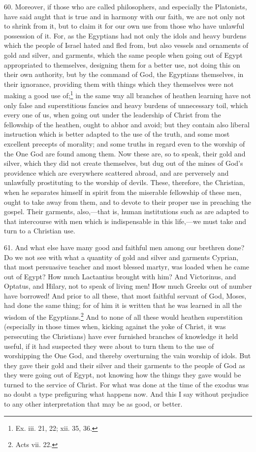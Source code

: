 60. Moreover, if those who are called philosophers, and especially the Platonists, have said aught that is true and in harmony with our faith, we are not only not to shrink from it, but to claim it for our own use from those who have unlawful possession of it. For, as the Egyptians had not only the idols and heavy burdens which the people of Israel hated and fled from, but also vessels and ornaments of gold and silver, and garments, which the same people when going out of Egypt appropriated to themselves, designing them for a better use, not doing this on their own authority, but by the command of God, the Egyptians themselves, in their ignorance, providing them with things which they themselves were not making a good use of;\footnote{Ex. iii. 21, 22; xii. 35, 36.} in the same way all branches of heathen learning have not only false and superstitious fancies and heavy burdens of unnecessary toil, which every one of us, when going out under the leadership of Christ from the fellowship of the heathen, ought to abhor and avoid; but they contain also liberal instruction which is better adapted to the use of the truth, and some most excellent precepts of morality; and some truths in regard even to the worship of the One God are found among them. Now these are, so to speak, their gold and silver, which they did not create themselves, but dug out of the mines of God’s providence which are everywhere scattered abroad, and are perversely and unlawfully prostituting to the worship of devils. These, therefore, the Christian, when he separates himself in spirit from the miserable fellowship of these men, ought to take away from them, and to devote to their proper use in preaching the gospel. Their garments, also,—that is, human institutions such as are adapted to that intercourse with men which is indispensable in this life,—we must take and turn to a Christian use.

61. And what else have many good and faithful men among our brethren done? Do we not see with what a quantity of gold and silver and garments Cyprian, that most persuasive teacher and most blessed martyr, was loaded when he came out of Egypt? How much Lactantius brought with him? And Victorinus, and Optatus, and Hilary, not to speak of living men! How much Greeks out of number have borrowed! And prior to all these, that most faithful servant of God, Moses, had done the same thing; for of him it is written that he was learned in all the wisdom of the Egyptians.\footnote{Acts vii. 22.} And to none of all these would heathen superstition (especially in those times when, kicking against the yoke of Christ, it was persecuting the Christians) have ever furnished branches of knowledge it held useful, if it had suspected they were about to turn them to the use of worshipping the One God, and thereby overturning the vain worship of idols. But they gave their gold and their silver and their garments to the people of God as they were going out of Egypt, not knowing how the things they gave would be turned to the service of Christ. For  what was done at the time of the exodus was no doubt a type prefiguring what happens now. And this I say without prejudice to any other interpretation that may be as good, or better.

